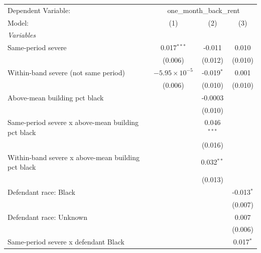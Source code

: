 \begingroup
\centering
\begin{tabular}{lccc}
   \tabularnewline \midrule \midrule
   Dependent Variable: & \multicolumn{3}{c}{one\_month\_back\_rent}\\
   Model:                                             & (1)                    & (2)           & (3)\\  
   \midrule
   \emph{Variables}\\
   Same-period severe                                 & 0.017$^{***}$          & -0.011        & 0.010\\   
                                                      & (0.006)                & (0.012)       & (0.010)\\   
   Within-band severe (not same period)               & $-5.95\times 10^{-5}$  & -0.019$^{*}$  & 0.001\\   
                                                      & (0.006)                & (0.010)       & (0.010)\\   
   Above-mean building pct black                      &                        & -0.0003       &   \\   
                                                      &                        & (0.010)       &   \\   
   Same-period severe x above-mean building pct black &                        & 0.046$^{***}$ &   \\   
                                                      &                        & (0.016)       &   \\   
   Within-band severe x above-mean building pct black &                        & 0.032$^{**}$  &   \\   
                                                      &                        & (0.013)       &   \\   
   Defendant race: Black                              &                        &               & -0.013$^{*}$\\   
                                                      &                        &               & (0.007)\\   
   Defendant race: Unknown                            &                        &               & 0.007\\   
                                                      &                        &               & (0.006)\\   
   Same-period severe x defendant Black               &                        &               & 0.017$^{*}$\\   

\end{tabular}
